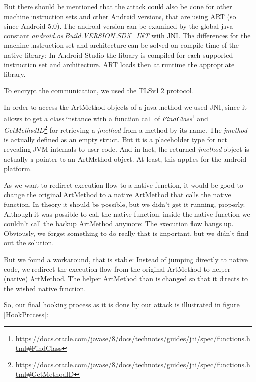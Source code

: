 But there should be mentioned that the attack could also be done for other machine instruction sets and other Android versions, that are using ART (so since Android 5.0). The android version can be examined by the global java constant \emph{android.os.Build.VERSION.SDK\_INT} with JNI.
The differences for the machine instruction set and architecture can be solved on compile time of the native library: In Android Studio the library is compiled for each supported instruction set and architecture. ART loads then at runtime the appropriate library.

To encrypt the communication, we used the TLSv1.2 protocol. 

In order to access the ArtMethod objects of a java method we used JNI, since it allows to get a class instance with a function call of  \emph{FindClass}\footnote{\url{https://docs.oracle.com/javase/8/docs/technotes/guides/jni/spec/functions.html\#FindClass}} and \emph{GetMethodID}\footnote{\url{https://docs.oracle.com/javase/8/docs/technotes/guides/jni/spec/functions.html\#GetMethodID}} for retrieving a \emph{jmethod} from a method by its name. The \emph{jmethod} is actually defined as an empty struct. But it is a placeholder type for not revealing JVM internals to user code. And in fact, the returned \emph{jmethod} object is actually a pointer to an ArtMethod object. At least, this applies for the android platform.


As we want to redirect execution flow to a native function, it would be good to change the original ArtMethod to a native ArtMethod that calls the native function. In theory it should be possible, but we didn't get it running, properly. Although it was possible to call the native function, inside the native function we couldn't call the backup ArtMethod anymore: The execution flow hangs up. Obviously, we forget something to do really that is important, but we didn't find out the solution. 

But we found a workaround, that is stable: Instead of jumping directly to native code, we redirect the execution flow from the original ArtMethod to helper (native) ArtMethod. The helper ArtMethod than is changed so that it directs to the wished native function.

So, our final hooking process as it is done by our attack is illustrated in figure \ref{HookProcess}:

